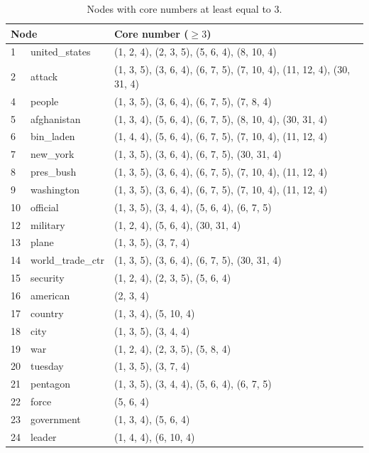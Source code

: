 \documentclass[a4paper,twoside,10pt]{article}
\begin{document}
\begin{center}
\begin{longtable}{p{}p{}p{}}
\caption{Nodes with core numbers at least equal to $3.$}
\label{reuterscore3}\\
\multicolumn{2}{l}{\textbf{Node}} & \textbf{Core number} ($\geq 3$)  \\
\endhead
1 & united\_states	& (1, 2, 4), (2, 3, 5), (5, 6, 4), (8, 10, 4) \\
2 & attack			& (1, 3, 5), (3, 6, 4), (6, 7, 5), (7, 10, 4), (11, 12, 4), (30, 31, 4)\\
4 & people         	& (1, 3, 5), (3, 6, 4), (6, 7, 5), (7, 8, 4) \\
5 & afghanistan   	&    (1, 3, 4), (5, 6, 4), (6, 7, 5), (8, 10, 4), (30, 31, 4) \\
6 & bin\_laden   	&     (1, 4, 4), (5, 6, 4), (6, 7, 5), (7, 10, 4), (11, 12, 4) \\
7 & new\_york  		&      (1, 3, 5), (3, 6, 4), (6, 7, 5), (30, 31, 4) \\
8 & pres\_bush  	&       (1, 3, 5), (3, 6, 4), (6, 7, 5), (7, 10, 4), (11, 12, 4) \\
9 & washington		&        (1, 3, 5), (3, 6, 4), (6, 7, 5), (7, 10, 4), (11, 12, 4) \\
10 & official		&          (1, 3, 5), (3, 4, 4), (5, 6, 4), (6, 7, 5) \\
12 & military       & (1, 2, 4), (5, 6, 4), (30, 31, 4)  \\
13 & plane          &  (1, 3, 5), (3, 7, 4) \\
14 & world\_trade\_ctr	&   (1, 3, 5), (3, 6, 4), (6, 7, 5), (30, 31, 4) \\
15 & security      	&    (1, 2, 4), (2, 3, 5), (5, 6, 4) \\
16 & american     	&     (2, 3, 4) \\
17 & country     	&      (1, 3, 4), (5, 10, 4) \\
18 & city       	&       (1, 3, 5), (3, 4, 4) \\
19 & war       		&        (1, 2, 4), (2, 3, 5), (5, 8, 4) \\
20 & tuesday  		&         (1, 3, 5), (3, 7, 4) \\
21 & pentagon		&          (1, 3, 5), (3, 4, 4), (5, 6, 4), (6, 7, 5) \\
22 & force  		&           (5, 6, 4) \\
23 & government     & (1, 3, 4), (5, 6, 4) \\
24 & leader        	&  (1, 4, 4), (6, 10, 4) \\

\end{longtable}
\end{center}
\end{document}

